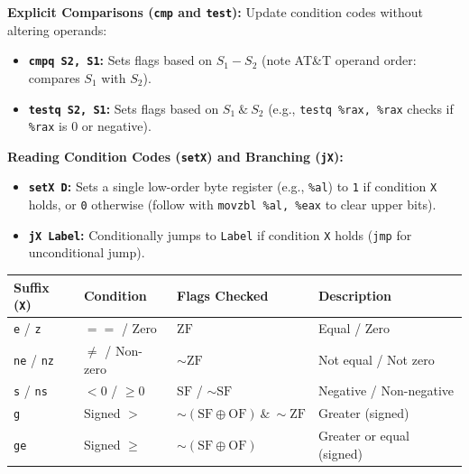 \begin{definition}
    \textbf{Explicit Comparisons (\texttt{cmp} and \texttt{test}):} Update condition codes without altering operands:
    \begin{itemize}
        \item \textbf{\texttt{cmpq S2, S1}:} Sets flags based on $S_1 - S_2$ (note AT\&T operand order: compares $S_1$ with $S_2$).
        \item \textbf{\texttt{testq S2, S1}:} Sets flags based on $S_1 \ \& \ S_2$ (e.g., \texttt{testq \%rax, \%rax} checks if \texttt{\%rax} is $0$ or negative).
    \end{itemize}
\end{definition}

\begin{definition}
    \textbf{Reading Condition Codes (\texttt{setX}) and Branching (\texttt{jX}):}
    \begin{itemize}
        \item \textbf{\texttt{setX D}:} Sets a single low-order byte register (e.g., \texttt{\%al}) to \texttt{1} if condition \texttt{X} holds, or \texttt{0} otherwise (follow with \texttt{movzbl \%al, \%eax} to clear upper bits).
        \item \textbf{\texttt{jX Label}:} Conditionally jumps to \texttt{Label} if condition \texttt{X} holds (\texttt{jmp} for unconditional jump).
    \end{itemize}
    \begin{center}
        \renewcommand{\arraystretch}{1.15}
        \setlength{\tabcolsep}{6pt}
        \begin{tabular}{|l|l|l|l|}
            \hline
            \textbf{Suffix (\texttt{X})} & \textbf{Condition} & \textbf{Flags Checked} & \textbf{Description} \\
            \hline
            \texttt{e} / \texttt{z} & $==$ / Zero & $\text{ZF}$ & Equal / Zero \\
            \texttt{ne} / \texttt{nz} & $\neq$ / Non-zero & $\sim\text{ZF}$ & Not equal / Not zero \\
            \texttt{s} / \texttt{ns} & $< 0$ / $\ge 0$ & $\text{SF}$ / $\sim\text{SF}$ & Negative / Non-negative \\
            \hline
            \texttt{g} & Signed $>$ & $\sim(\text{SF} \oplus \text{OF}) \ \& \ \sim\text{ZF}$ & Greater (signed) \\
            \texttt{ge} & Signed $\ge$ & $\sim(\text{SF} \oplus \text{OF})$ & Greater or equal (signed) \\

\end{tabular}
\end{center}
\end{definition}

